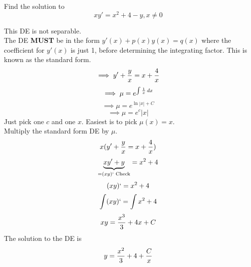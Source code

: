 \documentclass[english, 12pt]{article}
\begin{document}
\begin{exmp}
Find the solution to
\[ x y' = x^2 + 4 - y, x \neq 0 \]
\begin{sol}
This DE is not separable. \\
The DE \textbf{MUST} be in the form $y'(x) + p(x) y(x) = q(x)$ where the coefficient for $y'(x)$ is just 1, before determining the integrating factor. This is known as the standard form.
\[ \implies y' + \frac{y}{x}  = x + \frac{4}{x} \]
\[ \implies \mu = e^{\int \frac{1}{x} \,dx} \]
\[ \implies \mu = e^{\ln |x| + C} \]
\[ \implies \mu = e^c |x| \]
Just pick one $c$ and one $x$. Easiest is to pick $\mu (x) = x$.\\
Multiply the standard form DE by $\mu$.
\[x ( y' + \frac{y}{x}  = x + \frac{4}{x}) \]
\[\underbrace{x y' + y}_{ = (xy)` \text{ Check}}  = x^2 + 4 \]
\[ (xy)` = x^2 + 4 \]
\[\int (xy)` = \int x^2 + 4  \]
\[ xy = \frac{x^3}{3} + 4x + C \]
The solution to the DE is
\[ y = \frac{x^2}{3} + 4 + \frac{C}{x} \]
\end{sol}
\end{exmp}
\end{document}

